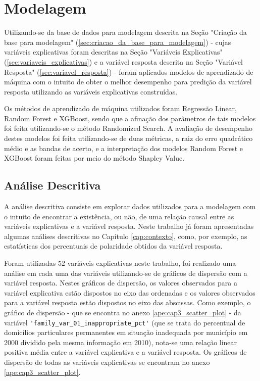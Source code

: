 \chapter{Modelagem}
\label{cap:modelagem}

Utilizando-se da base de dados para modelagem descrita na Seção "Criação da base para modelagem" (\ref{sec:criacao_da_base_para_modelagem}) - cujas variáveis explicativas foram descritas na Seção "Variáveis Explicativas" (\ref{sec:variaveis_explicativas}) e a variável resposta descrita na Seção "Variável Resposta" (\ref{sec:variavel_resposta}) - foram aplicados modelos de aprendizado de máquina com o intuito de obter o melhor desempenho para predição da variável resposta utilizando as variáveis explicativas construídas.

Os métodos de aprendizado de máquina utilizados foram Regressão Linear, Random Forest e XGBoost, sendo que a afinação dos parâmetros de tais modelos foi feita utilizando-se o método Randomized Search. A avaliação de desempenho destes modelos foi feita utilizando-se de duas métricas, a raiz do erro quadrático médio e as bandas de acerto, e a interpretação dos modelos Random Forest e XGBoost foram feitas por meio do método Shapley Value.

\section{Análise Descritiva}
\label{sec:analise_descritiva}

A análise descritiva consiste em explorar dados utilizados para a modelagem com o intuito de encontrar a existência, ou não, de uma relação causal entre as variáveis explicativas e a variável resposta. Neste trabalho já foram apresentadas algumas análises descritivas no Capítulo \ref{cap:contexto}, como, por exemplo, as estatísticas dos percentuais de polaridade obtidos da variável resposta.

Foram utilizadas 52 variáveis explicativas neste trabalho, foi realizado uma análise em cada uma das variáveis utilizando-se de gráficos de dispersão com a variável resposta. Nestes gráficos de dispersão, os valores observados para a variável explicativa estão dispostos no eixo das ordenadas e os valores observados para a variável resposta estão dispostos no eixo das abscissas. Como exemplo, o gráfico de dispersão - que se encontra no anexo \ref{ape:cap3_scatter_plot} - da variável \verb|'family_var_01_inappropriate_pct'| (que se trata do percentual de domicílios particulares permanentes em situação inadequada por município em 2000 dividido pela mesma informação em 2010), nota-se uma relação linear positiva média entre a variável explicativa e a variável resposta. Os gráficos de dispersão de todas as variáveis explicativas se encontram no anexo \ref{ape:cap3_scatter_plot}.

